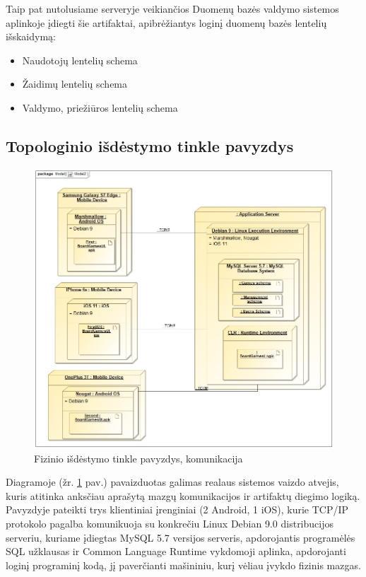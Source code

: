 \documentclass{VUMIFPSkursinis}
\begin{document}
			Taip pat nutolusiame serveryje veikiančios Duomenų bazės valdymo 				sistemos aplinkoje įdiegti šie artifaktai, apibrėžiantys loginį 			duomenų bazės lentelių išskaidymą:
  				\begin{itemize}
					\item Naudotojų lentelių schema
					\item Žaidimų lentelių schema
					\item Valdymo, priežiūros lentelių schema
				\end{itemize}
	\subsection{Topologinio išdėstymo tinkle pavyzdys}
				\begin{figure}[H]
				\centering
				\includegraphics[scale=0.4]{img/TopologyExample}
				\caption{Fizinio išdėstymo tinkle pavyzdys, komunikacija}
				\label{img:TopologyExample}
			\end{figure}
		Diagramoje (žr. \ref{img:TopologyExample} pav.) pavaizduotas galimas realaus sistemos vaizdo atvejis, kuris atitinka 		anksčiau aprašytą mazgų komunikacijos ir artifaktų diegimo logiką. Pavyzdyje 			pateikti trys klientiniai įrenginiai (2 Android, 1 iOS), kurie TCP/IP protokolo 		pagalba komunikuoja su konkrečiu Linux Debian 9.0 distribucijos serveriu, kuriame 			įdiegtas MySQL 5.7 versijos serveris, apdorojantis programėlės SQL užklausas ir 		Common Language Runtime vykdomoji aplinka, apdorojanti loginį programinį kodą, jį 			paverčianti mašininiu, kurį vėliau įvykdo fizinis mazgas.
\end{document}
